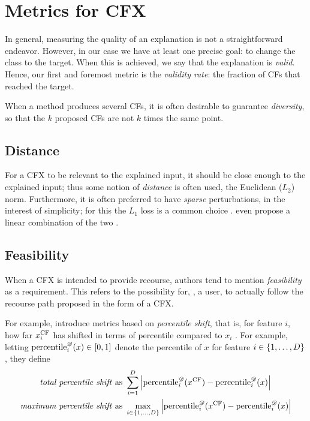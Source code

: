 \documentclass[../main.tex]{subfiles}
\begin{document}
\section{Metrics for CFX}

In general, measuring the quality of an explanation is not a straightforward endeavor.
However, in our case we have at least one precise goal: to change the class to the target.
When this is achieved, we say that the explanation is \emph{valid}.
Hence, our first and foremost metric is the \emph{validity rate}: the fraction of CFs that reached the target.

When a method produces several CFs, it is often desirable to guarantee \emph{diversity}, so that the $k$ proposed CFs are not $k$ times the same point.

\subsection{Distance}

For a CFX to be relevant to the explained input, it should be close enough to the explained input; thus some notion of \emph{distance} is often used, \eg{} the Euclidean ($L_2$) norm.
Furthermore, it is often preferred to have \emph{sparse} perturbations, in the interest of simplicity; for this the $L_1$ loss is a common choice \cite{joshiRealistic2019,antoranGetting2021}.
\citeauthor{vanlooverenInterpretable2021} even propose a linear combination of the two \cite{vanlooverenInterpretable2021}.

\subsection{Feasibility}

When a CFX is intended to provide recourse, authors tend to mention \emph{feasibility} as a requirement.
This refers to the possibility for, \eg{}, a user, to actually follow the recourse path proposed in the form of a CFX.

For example, \citeauthor{pawelczykLearning2020} introduce metrics based on \emph{percentile shift}, that is, for feature $i$, how far $x^\mathrm{CF}_i$ has shifted in terms of percentile compared to $x_i$ \cite{pawelczykLearning2020}.
For example, letting $\text{percentile}_i^{\mathscr{D}}(x) \in [0, 1]$ denote the percentile of $x$ for feature $i \in \{1, \ldots, D\}$, they define
\begin{align*}
    \text{\emph{total percentile shift} as }   & \sum_{i=1}^D \left\lvert \text{percentile}_i^{\mathscr{D}}(x^\mathrm{CF}) - \text{percentile}_i^{\mathscr{D}}(x) \right\rvert                  \\
    \text{\emph{maximum percentile shift} as } & \max_{i \in \{1, \ldots, D\}} \left\lvert \text{percentile}_i^{\mathscr{D}}(x^\mathrm{CF}) - \text{percentile}_i^{\mathscr{D}}(x) \right\rvert
\end{align*}
\end{document}
